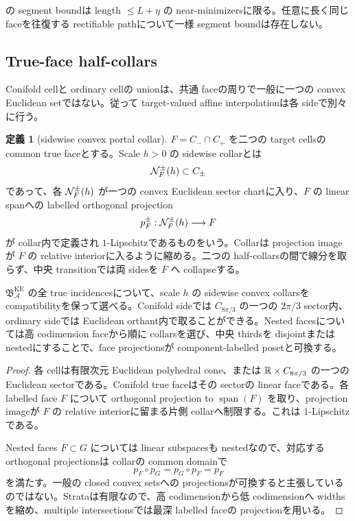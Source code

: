 \documentclass[11pt,a4paper]{ltjsarticle}
\newcommand{\cA}{\mathcal A}\newcommand{\cB}{\mathcal B}\newcommand{\cC}{\mathcal C}
\newcommand{\BKE}{\mathfrak B_{\cA}^{\mathrm{KE}}}
\theoremstyle{plain}
\theoremstyle{definition}
\newtheorem{definition}[theorem]{定義}\newtheorem{hypothesis}[theorem]{仮定}
\theoremstyle{remark}
\begin{document}
\begin{warning}
 の segment boundは length $\le L+\eta$ の near-minimizersに限る。任意に長く同じ faceを往復する rectifiable pathについて一様 segment boundは存在しない。
\end{warning}

\subsection{True-face half-collars}
Conifold cellと ordinary cellの unionは、共通 faceの周りで一般に一つの convex Euclidean setではない。従って target-valued affine interpolationは各 sideで別々に行う。

\begin{definition}[sidewise convex portal collar]\label{def:sidewise-collar}
$F=C_-\cap C_+$ を二つの target cellsの common true faceとする。Scale $h>0$ の sidewise collarとは
\[
 \mathcal N_F^\pm(h)\subset C_\pm
\]
であって、各 $\mathcal N_F^\pm(h)$ が一つの convex Euclidean sector chartに入り、$F$ の linear spanへの labelled orthogonal projection
\[
 p_F^\pm:\mathcal N_F^\pm(h)\longrightarrow F
\]
が collar内で定義され $1$-Lipschitzであるものをいう。Collarは projection imageが $F$ の relative interiorに入るように縮める。二つの half-collarsの間で線分を取らず、中央 transitionでは両 sidesを $F$ へ collapseする。
\end{definition}

\begin{proposition}\label{prop:canonical-half-collars}
$\BKE$ の全 true incidencesについて、scale $h$ の sidewise convex collarsを compatibilityを保って選べる。Conifold sideでは $C_{8\pi/3}$ の一つの $2\pi/3$ sector内、ordinary sideでは Euclidean orthant内で取ることができる。Nested facesについては高 codimension faceから順に collarsを選び、中央 thirdsを disjointまたは nestedにすることで、face projectionsが component-labelled posetと可換する。
\end{proposition}

\begin{proof}
各 cellは有限次元 Euclidean polyhedral cone、または $\mathbb R\times C_{8\pi/3}$ の一つの Euclidean sectorである。Conifold true faceはその sectorの linear faceである。各 labelled face $F$ について orthogonal projection to $\operatorname{span}(F)$ を取り、projection imageが $F$ の relative interiorに留まる片側 collarへ制限する。これは $1$-Lipschitzである。

Nested faces $F\subset G$ については linear subspacesも nestedなので、対応する orthogonal projectionsは collarの common domainで
\[
 p_F\circ p_G=p_G\circ p_F=p_F
\]
を満たす。一般の closed convex setsへの projectionsが可換すると主張しているのではない。Strataは有限なので、高 codimensionから低 codimensionへ widthsを縮め、multiple intersectionsでは最深 labelled faceの projectionを用いる。
\end{proof}
\end{document}
